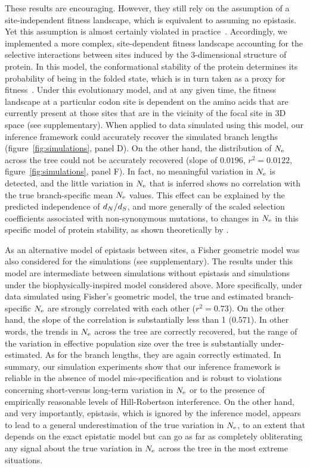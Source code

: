 \documentclass{article}
\begin{document}
    These results are encouraging.
    However, they still rely on the assumption of a site-independent fitness landscape, which is equivalent to assuming no epistasis.
    Yet this assumption is almost certainly violated in practice~\citep{Pollock2014,Shah2015}.
    Accordingly, we implemented a more complex, site-dependent fitness landscape accounting for the selective interactions between sites induced by the 3-dimensional structure of protein.
    In this model, the conformational stability of the protein determines its probability of being in the folded state, which is in turn taken as a proxy for fitness~\citep{Williams2006, Goldstein2011, Pollock2012}.
    Under this evolutionary model, and at any given time, the fitness landscape at a particular {codon} site is dependent on the amino acids that are currently present at those sites that are in the vicinity of the focal site in 3D space (see supplementary).
    When applied to data simulated using this model, our inference framework could accurately recover the simulated branch lengths (figure~\ref{fig:simulations}, panel D).
    On the other hand, the distribution of $N_{\text{e}}$ across the tree could not be accurately recovered (slope of $0.0196$, $r^2 = 0.0122$, figure~\ref{fig:simulations}, panel F).
    In fact, no meaningful variation in $N_{\text{e}}$ is detected, and the little variation in $N_{\text{e}}$ that is inferred shows no correlation with the true branch-specific mean $N_{\text{e}}$ values.
    This effect can be explained by the predicted independence of $d_N / d_S$, and more generally of the scaled selection coefficients associated with {non-synonymous} mutations, to changes in $N_{\text{e}}$ in this specific model of protein stability, as shown theoretically by \citet{Goldstein2013}.

    As an alternative model of epistasis between sites, a Fisher geometric model was also considered for the simulations (see supplementary).
    The results under this model are intermediate between simulations without epistasis and simulations under the biophysically-inspired model considered above.
    More specifically, under data simulated using Fisher’s geometric model, the true and estimated branch-specific $N_{\text{e}}$ are strongly correlated with each other ($r^2 = 0.73$).
    On the other hand, the slope of the correlation is substantially less than 1 ($0.571$).
    In other words, the trends in $N_{\text{e}}$ across the tree are correctly recovered, but the range of the variation in {effective population size} over the tree is substantially under-estimated.
    As for the branch lengths, they are again correctly estimated.
    In summary, our simulation experiments show that our inference framework is reliable in the absence of model mis-specification and is robust to violations concerning short-versus long-term variation in $N_{\text{e}}$ or to the presence of empirically reasonable levels of Hill-Robertson interference.
    On the other hand, and very importantly, epistasis, which is ignored by the inference model, appears to lead to a general underestimation of the true variation in $N_{\text{e}}$, to an extent that depends on the exact epistatic model but can go as far as completely obliterating any signal about the true variation in $N_{\text{e}}$ across the tree in the most extreme situations.
\end{document}
